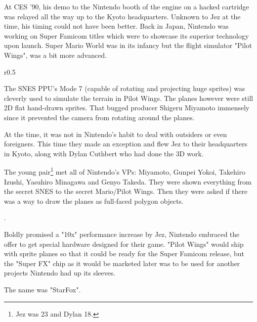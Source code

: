At CES '90, his demo to the Nintendo booth of the engine on a hacked cartridge was relayed all the way up to the Kyoto headquarters. Unknown to Jez at the time, his timing could not have been better. Back in Japan, Nintendo was working on Super Famicom titles which were to showcase its superior technology upon launch. Super Mario World was in its infancy but the flight simulator "Pilot Wings", was a bit more advanced.\\ 
\par
\begin{wrapfigure}[14]{r}{0.5\textwidth}{
\centering {}}
\end{wrapfigure}
The SNES PPU's Mode 7 (capable of rotating and projecting huge sprites) was cleverly used to simulate the terrain in Pilot Wings. The planes however were still 2D flat hand-drawn sprites. That bugged producer Shigeru Miyamoto immensely since it prevented the camera from rotating around the planes.\\
\par
At the time, it was not in Nintendo's habit to deal with outsiders or even foreigners. This time they made an exception and flew Jez to their headquarters in Kyoto, along with Dylan Cuthbert who had done the 3D work.\\
\par
 The young pair\footnote{Jez was 23 and Dylan 18.} met all of Nintendo's VPs: Miyamoto, Gunpei Yokoi, Takehiro Izushi, Yasuhiro Minagawa and Genyo Takeda. They were shown everything from the secret SNES to the secret Mario/Pilot Wings. Then they were asked if there was a way to draw the planes as full-faced polygon objects.\\
\par
{}.\\
\par

Boldly promised a "10x" performance increase by Jez, Nintendo embraced the offer to get special hardware designed for their game. "Pilot Wings" would ship with sprite planes so that it could be ready for the Super Famicom release, but the "Super FX" chip as it would be marketed later was to be used for another projects Nintendo had up its sleeves.\\
\par
The name was "StarFox".

